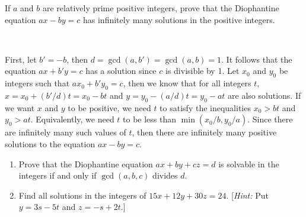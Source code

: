 \begin{exercise}
    If $a$ and $b$ are relatively prime positive integers, prove that the Diophantine equation $ax - by = c$ has infinitely many solutions in the positive integers.

    \noindent [\textit{Hint:} There exist integers $x_0$ and $y_0$ such that $ax_0 + by_0 = 1$. For any integer $t$, which is larger than both $|x_0|/b$ and $|y_0|/a$, $x = x_0 + bt$ and $y = -(y_0 - at)$ are a positive solution of the given equation.] \\
\end{exercise}

\begin{solution}
    First, let $b' = -b$, then $d = \gcd(a, b') = \gcd(a,b) = 1$. It follows that the equation $ax + b'y = c$ has a solution since $c$ is divisible by 1. Let $x_0$ and $y_0$ be integers such that $ax_0 + b'y_0 = c$, then we know that for all integers $t$, $x = x_0 + (b'/d)t = x_0 - bt$ and $y = y_0 - (a/d)t = y_0 - at$ are also solutions. If we want $x$ and $y$ to be positive, we need $t$ to satisfy the inequalities $x_0 > bt$ and $y_0 > at$. Equivalently, we need $t$ to be less than $\min(x_0/b, y_0/a)$. Since there are infinitely many such values of $t$, then there are infinitely many positive solutions to the equation $ax - by = c$.\\
\end{solution}

\begin{exercise}
    \begin{enumerate}
        \item Prove that the Diophantine equation $ax + by + cz = d$ is solvable in the integers if and only if $\gcd(a,b,c)$ divides $d$.
        \item Find all solutions in the integers of $15x + 12y + 30z = 24$. [\textit{Hint:} Put $y = 3s - 5t$ and $z = -s + 2t$.]
    \end{enumerate}
\end{exercise}

